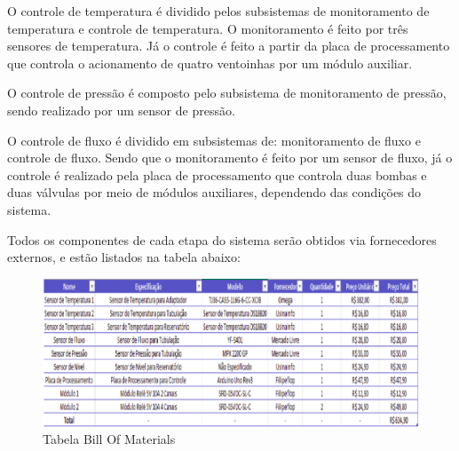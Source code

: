 O controle de temperatura é dividido pelos subsistemas de monitoramento de temperatura e controle de temperatura. O monitoramento é feito por três sensores de temperatura. Já o controle é feito a partir da placa de processamento que controla o acionamento de quatro ventoinhas por um módulo auxiliar.

O controle de pressão é composto pelo subsistema de monitoramento de pressão, sendo realizado por um sensor de pressão.

O controle de fluxo é dividido em subsistemas de: monitoramento de fluxo e controle de fluxo. Sendo que o monitoramento é feito por um sensor de fluxo, já o controle é realizado pela placa de processamento que controla duas bombas e duas válvulas por meio de módulos auxiliares, dependendo das condições do sistema.

Todos os componentes de cada etapa do sistema serão obtidos via fornecedores externos, e estão listados na tabela abaixo:

\begin{figure}[ht]                                          
    \includegraphics[scale=0.7]{figuras/bom1.eps}
    \caption{ Tabela Bill Of Materials }   \label{figbom1}              
\end{figure} 
